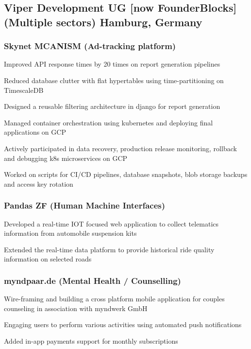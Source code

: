 \documentclass[letter,10pt]{article}
\begin{document}

\subsection{Viper Development UG [now FounderBlocks] (Multiple sectors) \hfill Hamburg, Germany}

\vspace{1em}
\subsubsection*{Skynet MCANISM (Ad-tracking platform)}
\begin{zitemize}
    \item Improved API response times by 20 times on report generation pipelines
    \item Reduced database clutter with flat hypertables using time-partitioning on
    TimescaleDB
    \item Designed a reusable filtering architecture in django for report generation
    \item Managed container orchestration using kubernetes and deploying final
    applications on GCP
    \item Actively participated in data recovery, production release monitoring, rollback
    and debugging k8s microservices on GCP
    \item Worked on scripts for CI/CD pipelines, database snapshots, blob storage backups
    and access key rotation
\end{zitemize}

\subsubsection*{Pandas ZF (Human Machine Interfaces)}
\begin{zitemize}
    \item Developed a real-time IOT focused web application to collect telematics
    information from automobile suspension kits
    \item Extended the real-time data platform to provide historical ride quality
    information on selected roads
\end{zitemize}

\subsubsection*{myndpaar.de (Mental Health / Counselling)}
\begin{zitemize}
    \item Wire-framing and building a cross platform mobile application for couples
    counseling in association with myndwerk GmbH
    \item Engaging users to perform various activities using automated push notifications
    \item Added in-app payments support for monthly subscriptions
\end{zitemize}
\end{document}
